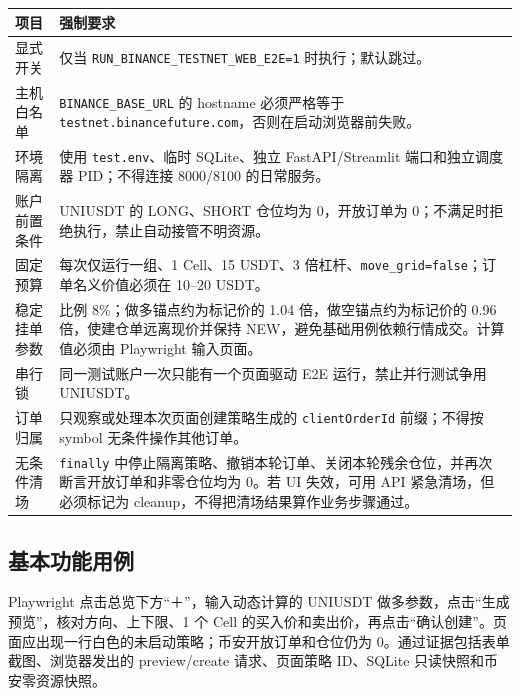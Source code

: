 \begin{longtable}{p{3.3cm}p{11.2cm}}
  \toprule
  项目 & 强制要求 \\
  \midrule
  \endhead
  显式开关 & 仅当 \texttt{RUN\_BINANCE\_TESTNET\_WEB\_E2E=1} 时执行；默认跳过。 \\
  主机白名单 & \texttt{BINANCE\_BASE\_URL} 的 hostname 必须严格等于 \texttt{testnet.binancefuture.com}，否则在启动浏览器前失败。 \\
  环境隔离 & 使用 \texttt{test.env}、临时 SQLite、独立 FastAPI/Streamlit 端口和独立调度器 PID；不得连接 8000/8100 的日常服务。 \\
  账户前置条件 & UNIUSDT 的 LONG、SHORT 仓位均为 0，开放订单为 0；不满足时拒绝执行，禁止自动接管不明资源。 \\
  固定预算 & 每次仅运行一组、1 Cell、15 USDT、3 倍杠杆、\texttt{move\_grid=false}；订单名义价值必须在 10--20 USDT。 \\
  稳定挂单参数 & 比例 8\%；做多锚点约为标记价的 1.04 倍，做空锚点约为标记价的 0.96 倍，使建仓单远离现价并保持 NEW，避免基础用例依赖行情成交。计算值必须由 Playwright 输入页面。 \\
  串行锁 & 同一测试账户一次只能有一个页面驱动 E2E 运行，禁止并行测试争用 UNIUSDT。 \\
  订单归属 & 只观察或处理本次页面创建策略生成的 \texttt{clientOrderId} 前缀；不得按 symbol 无条件操作其他订单。 \\
  无条件清场 & \texttt{finally} 中停止隔离策略、撤销本轮订单、关闭本轮残余仓位，并再次断言开放订单和非零仓位均为 0。若 UI 失效，可用 API 紧急清场，但必须标记为 cleanup，不得把清场结果算作业务步骤通过。 \\
  \bottomrule
\end{longtable}

\subsection{基本功能用例}


Playwright 点击总览下方“＋”，输入动态计算的 UNIUSDT 做多参数，点击“生成预览”，核对方向、上下限、1 个 Cell 的买入价和卖出价，再点击“确认创建”。页面应出现一行白色的未启动策略；币安开放订单和仓位仍为 0。通过证据包括表单截图、浏览器发出的 preview/create 请求、页面策略 ID、SQLite 只读快照和币安零资源快照。


